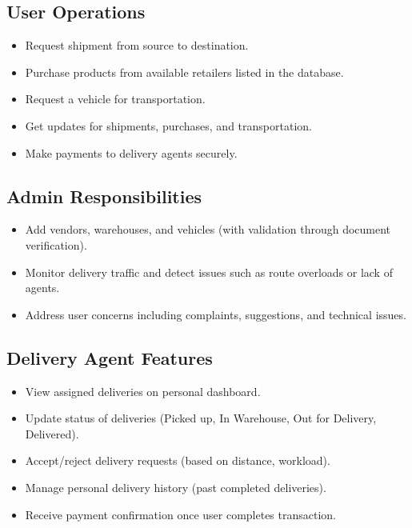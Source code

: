 \documentclass[12pt,a4paper]{article}
\begin{document}
\subsection{User Operations}
\begin{itemize}[noitemsep]
  \item Request shipment from source to destination.
  \item Purchase products from available retailers listed in the database.
  \item Request a vehicle for transportation.
  \item Get updates for shipments, purchases, and transportation.
  \item Make payments to delivery agents securely.
\end{itemize}

\subsection{Admin Responsibilities}
\begin{itemize}[noitemsep]
  \item Add vendors, warehouses, and vehicles (with validation through document verification).
  \item Monitor delivery traffic and detect issues such as route overloads or lack of agents.
  \item Address user concerns including complaints, suggestions, and technical issues.
\end{itemize}

\subsection{Delivery Agent Features}
\begin{itemize}[noitemsep]
  \item View assigned deliveries on personal dashboard.
  \item Update status of deliveries (Picked up, In Warehouse, Out for Delivery, Delivered).
  \item Accept/reject delivery requests (based on distance, workload).
  \item Manage personal delivery history (past completed deliveries).
  \item Receive payment confirmation once user completes transaction.
\end{itemize}
\end{document}
